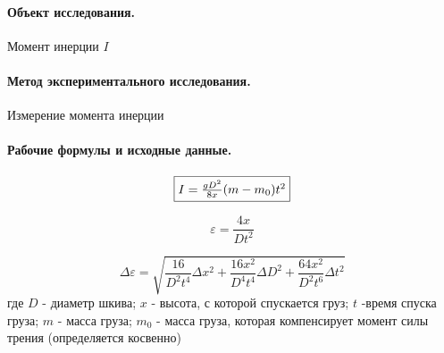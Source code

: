 \documentclass{article}
\begin{document}
\paragraph{Объект исследования.}
Момент инерции $I$

\paragraph{Метод экспериментального исследования.}
Измерение момента инерции

 \paragraph{Рабочие формулы и исходные данные.}\hypertarget{formuls}{}
 \begin{equation}
 	\fbox{$I=\frac{g D^2}{8x}(m-m_0)t^2$}
 \end{equation}

\begin{equation}
	\varepsilon=\frac{4x}{Dt^2}
\end{equation}

\begin{equation}
	\Delta \varepsilon=\sqrt{\frac{16}{D^2t^4}\Delta x^2+\frac{16x^2}{D^4t^4}\Delta D^2+\frac{64x^2}{D^2t^6}\Delta t^2}
\end{equation}
где $D$ - диаметр шкива; $x$ - высота, с которой спускается груз; $ t $ -время спуска груза; $m$ - масса груза; $m_0$ - масса груза, которая компенсирует момент силы трения (определяется косвенно)
\end{document}
